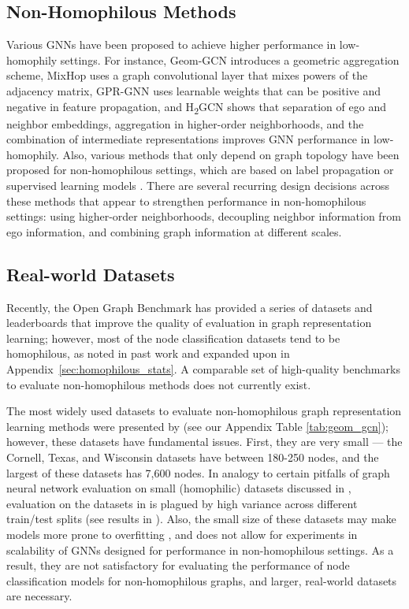 \documentclass[sigconf, balance=false]{acmart}
\begin{document}
\subsection{Non-Homophilous Methods}

Various GNNs have been proposed to achieve higher performance in low-homophily settings. For instance, Geom-GCN \cite{pei2019geom} introduces a geometric aggregation scheme, MixHop \cite{abu2019mixhop} uses a graph convolutional layer that mixes powers of the adjacency matrix, GPR-GNN \cite{chien2021adaptive} uses learnable weights that can be positive and negative in feature propagation, and H\textsubscript{2}GCN \cite{zhu2020beyond} shows that separation of ego and neighbor embeddings, aggregation in higher-order neighborhoods, and the combination of intermediate representations improves GNN performance in low-homophily. Also, various methods that only depend on graph topology have been proposed for non-homophilous settings, which are based on label propagation or supervised learning models \cite{peel2017graph, altenburger2018monophily, chin2019decoupled, zheleva2009to}. There are several recurring design decisions across these methods that appear to strengthen performance in non-homophilous settings: using higher-order neighborhoods, decoupling neighbor information from ego information, and combining graph information at different scales.


\subsection{Real-world Datasets}

Recently, the Open Graph Benchmark \cite{hu2020open} has provided a series of datasets and leaderboards that improve the quality of evaluation in graph representation learning; however, most of the node classification datasets tend to be homophilous, as noted in past work \cite{zhu2020beyond} and expanded upon in Appendix~\ref{sec:homophilous_stats}. A comparable set of high-quality benchmarks to evaluate non-homophilous methods does not currently exist. 

The most widely used datasets to evaluate non-homophilous graph representation learning methods were presented by \cite{pei2019geom} (see our Appendix Table \ref{tab:geom_gcn}); however, these datasets have fundamental issues. First, they are very small --- the Cornell, Texas, and Wisconsin datasets have between 180-250 nodes, and the largest of these datasets has 7,600 nodes. In analogy to certain pitfalls of graph neural network evaluation on small (homophilic) datasets discussed in \cite{shchur2018pitfalls}, evaluation on the datasets in \cite{pei2019geom} is plagued by high variance across different train/test splits (see results in \cite{zhu2020beyond}). Also, the small size of these datasets may make models more prone to overfitting \cite{dwivedi2020benchmarking}, and does not allow for experiments in scalability of GNNs  designed for performance in non-homophilous settings. As a result, they are not satisfactory for evaluating the performance of node classification models for non-homophilous graphs, and larger, real-world datasets are necessary. 
\end{document}
